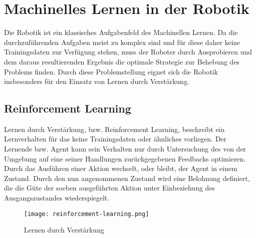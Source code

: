 \chapter{Machinelles Lernen in der Robotik}

Die Robotik ist ein klassisches Aufgabenfeld des Machinellen Lernen. Da die durch\-zu\-führenden Aufgaben meist zu komplex sind und für diese daher keine Trainingsdaten zur Verfügung stehen, muss der Roboter durch Ausprobieren und dem daraus resultierenden Ergebnis die optimale Strategie zur Behebung des Problems finden. Durch diese Problemstellung eignet sich die Robotik insbesonders für den Einsatz von Lernen durch Verstärkung. \cite{Ertel_2013}

\section{Reinforcement Learning}

Lernen durch Verstärkung, bzw. Reinforcement Learning, beschreibt ein Lernverhalten für das keine Trainingsdaten oder ähnliches vorliegen. Der Lernende bzw. Agent kann sein Verhalten nur durch Untersuchung des von der Umgebung auf eine seiner Handlungen zurückgegebenen Feedbacks optimieren. Durch das Ausführen einer Aktion wechselt, oder bleibt, der Agent in einem Zustand. Durch den nun angenommenen Zustand wird eine Belohnung definiert, die die Güte der soeben ausgeführten Aktion unter Einbeziehung des Ausgangszustandes wiederspiegelt. \cite{Ertel_2013}\par

\begin{figure}[H]
	\centering
	\texttt{[image: reinforcement-learning.png]}
	\caption{Lernen durch Verstärkung}
	\label{fig:reinforcement-learning}
\end{figure}

